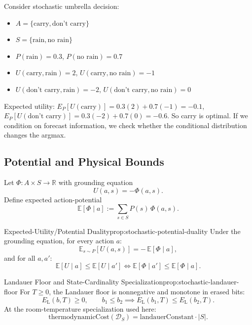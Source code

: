 \begin{example}
Consider stochastic umbrella decision:
\begin{itemize}
\item $A = \{\text{carry}, \text{don't carry}\}$
\item $S = \{\text{rain}, \text{no rain}\}$
\item $P(\text{rain}) = 0.3$, $P(\text{no rain}) = 0.7$
\item $U(\text{carry}, \text{rain}) = 2$, $U(\text{carry}, \text{no rain}) = -1$
\item $U(\text{don't carry}, \text{rain}) = -2$, $U(\text{don't carry}, \text{no rain}) = 0$
\end{itemize}
Expected utility: $E_P[U(\text{carry})] = 0.3(2) + 0.7(-1) = -0.1$, $E_P[U(\text{don't carry})] = 0.3(-2) + 0.7(0) = -0.6$. So carry is optimal. If we condition on forecast information, we check whether the conditional distribution changes the argmax.
\end{example}

\subsection{Potential and Physical Bounds}

\begin{definition}
Let $\Phi : A \times S \to \mathbb{R}$ with grounding equation
\[
U(a,s) = -\Phi(a,s).
\]
Define expected action-potential
\[
\mathbb{E}[\Phi\mid a] := \sum_{s\in S} P(s)\,\Phi(a,s).
\]
\end{definition}


\begin{claim}{Expected-Utility/Potential Duality}{prop:stochastic-potential-duality}
Under the grounding equation, for every action $a$:
\[
\mathbb{E}_{s\sim P}[U(a,s)] = -\,\mathbb{E}[\Phi\mid a],
\]
and for all $a,a'$:
\[
\mathbb{E}[U\mid a]\le \mathbb{E}[U\mid a']
\iff
\mathbb{E}[\Phi\mid a']\le \mathbb{E}[\Phi\mid a].
\]
\end{claim}


\begin{claim}{Landauer Floor and State-Cardinality Specialization}{prop:stochastic-landauer-floor}
For $T\ge 0$, the Landauer floor is nonnegative and monotone in erased bits:
\[
E_{\mathrm{L}}(b,T)\ge 0,\qquad
b_1\le b_2 \implies E_{\mathrm{L}}(b_1,T)\le E_{\mathrm{L}}(b_2,T).
\]
At the room-temperature specialization used here:
\[
\mathrm{thermodynamicCost}(\mathcal{D}_S)=\mathrm{landauerConstant}\cdot |S|.
\]
\end{claim}

